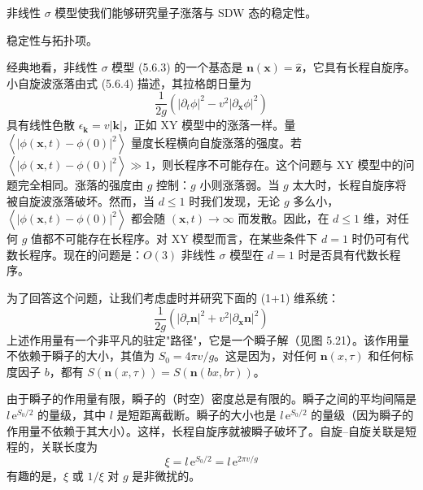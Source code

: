\begin{keypoints}
\item 非线性 $\sigma$ 模型使我们能够研究量子涨落与 SDW 态的稳定性。
\item 稳定性与拓扑项。
\end{keypoints}

经典地看，非线性 $\sigma$ 模型 (5.6.3) 的一个基态是 $\pmb{n}(\pmb{x})=\hat{\pmb{z}}$，它具有长程自旋序。小自旋波涨落由式 (5.6.4) 描述，其拉格朗日量为
\begin{equation*}
\frac{1}{2g}\left(|\partial_{t}\phi|^{2}-v^{2}|\partial_{\pmb{x}}\phi|^{2}\right)
\end{equation*}
具有线性色散 $\epsilon_{\pmb{k}}=v|\pmb{k}|$，正如 XY 模型中的涨落一样。量 $\left\langle|\phi(\pmb{x},t)-\phi(0)|^{2}\right\rangle$ 量度长程横向自旋涨落的强度。若 $\left\langle|\phi(\pmb{x},t)-\phi(0)|^{2}\right\rangle\gg 1$，则长程序不可能存在。这个问题与 XY 模型中的问题完全相同。涨落的强度由 $g$ 控制：$g$ 小则涨落弱。当 $g$ 太大时，长程自旋序将被自旋波涨落破坏。然而，当 $d\leqslant 1$ 时我们发现，无论 $g$ 多么小，$\left\langle|\phi(\pmb{x},t)-\phi(0)|^{2}\right\rangle$ 都会随 $(\pmb{x},t)\to\infty$ 而发散。因此，在 $d\leqslant 1$ 维，对任何 $g$ 值都不可能存在长程序。对 XY 模型而言，在某些条件下 $d=1$ 时仍可有代数长程序。现在的问题是：$O(3)$ 非线性 $\sigma$ 模型在 $d=1$ 时是否具有代数长程序。


为了回答这个问题，让我们考虑虚时并研究下面的 (1+1) 维系统：
\begin{equation*}
\frac{1}{2g}\left(|\partial_{\tau}\pmb{n}|^{2}+v^{2}|\partial_{\pmb{x}}\pmb{n}|^{2}\right)
\end{equation*}
上述作用量有一个非平凡的驻定"路径"，它是一个瞬子解（见图 5.21）。该作用量不依赖于瞬子的大小，其值为 $S_{0}=4\pi v/g$。这是因为，对任何 $\pmb{n}(x,\tau)$ 和任何标度因子 $b$，都有 $S(\pmb{n}(x,\tau))=S(\pmb{n}(bx,b\tau))$。

由于瞬子的作用量有限，瞬子的（时空）密度总是有限的。瞬子之间的平均间隔是 $l\,\mathrm{e}^{S_{0}/2}$ 的量级，其中 $l$ 是短距离截断。瞬子的大小也是 $l\,\mathrm{e}^{S_{0}/2}$ 的量级（因为瞬子的作用量不依赖于其大小）。这样，长程自旋序就被瞬子破坏了。自旋--自旋关联是短程的，关联长度为
\begin{equation*}
\xi=l\,\mathrm{e}^{S_{0}/2}=l\,\mathrm{e}^{2\pi v/g} \tag{5.6.8}
\end{equation*}
有趣的是，$\xi$ 或 $1/\xi$ 对 $g$ 是非微扰的。

